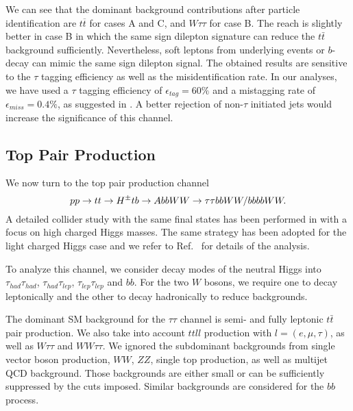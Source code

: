 We can see that the dominant background contributions after particle identification are $t\overline{t}$ for cases A and C, and $W\tau\tau$   for case B.  The reach is slightly better in case B in which the same sign dilepton signature can reduce the $t\bar{t}$ background sufficiently.  Nevertheless, soft leptons from underlying events or $b$-decay can mimic the same sign dilepton signal.  The obtained   results are sensitive to the $\tau$ tagging efficiency as well as the misidentification rate.  In our analyses, we have used a  $\tau$ tagging efficiency of $\epsilon_{tag}=60\%$ and a mistagging rate of $\epsilon_{miss}=0.4\%$,  as suggested in \cite{Anderson:2013kxz}.  A better rejection of non-$\tau$ initiated jets would increase the significance of this channel. 

\subsection{Top Pair Production }
 \label{sec:analysis_tt}

We now turn to the top pair production channel 
\begin{equation}
pp \rightarrow tt \to H^{\pm} tb \rightarrow  AbbWW\rightarrow  \tau\tau bbWW/bbbbWW.
\end{equation} 
A detailed collider study with the same final states has been performed in \cite{Coleppa:2014cca} with a focus on high charged Higgs masses. The same strategy has been adopted for the light charged Higgs case and we refer to Ref.~\cite{Coleppa:2014cca} for details of the analysis. 

To analyze this channel,  we consider   decay modes of the neutral Higgs into $\tau_{had}\tau_{had}$, $\tau_{had}\tau_{lep}$, $\tau_{lep}\tau_{lep}$ and $bb$.    For the two $W$ bosons, we require one to decay leptonically and the other to decay hadronically to reduce backgrounds.
  
 The dominant SM background for the $\tau\tau$ channel is semi- and fully leptonic $t\bar{t}$ pair production. We also take into account  $ttll$ production with $l = (e, \mu, \tau)$, as well as $W\tau\tau$ and $WW\tau\tau$.  We ignored the subdominant backgrounds from single vector boson production, $WW$, $ZZ$, single top production, as well as multijet QCD background.   Those backgrounds are either small or can be sufficiently suppressed by the cuts imposed.   Similar backgrounds are considered for the $bb$ process.   

